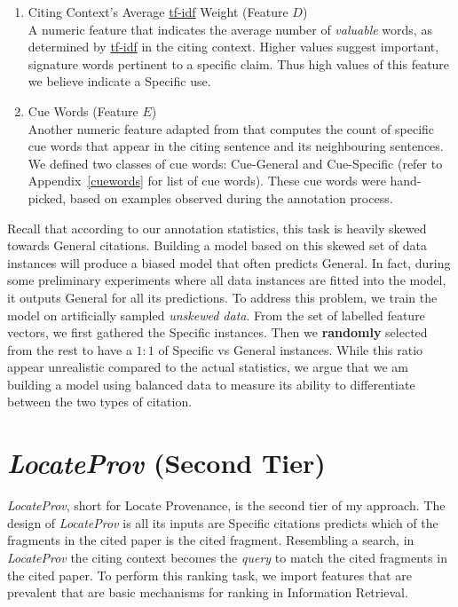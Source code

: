 \begin{enumerate}
\item Citing Context's Average \url{tf-idf} Weight (Feature $D$)\\
A numeric feature that indicates the average number of \textit{valuable} words, as determined by \url{tf-idf} \cite{irtextbook} in the citing context. Higher values suggest important, signature words pertinent to a specific claim.  Thus high values of this feature we believe indicate a Specific use.

\item Cue Words (Feature $E$)\\
Another numeric feature adapted from  that computes the count of specific cue words that appear in the citing sentence and its neighbouring sentences. We defined two classes of cue words: Cue-General and Cue-Specific (refer to Appendix~\ref{cuewords} for list of cue words). These cue words were hand-picked, based on examples observed during the annotation process.
\end{enumerate}

Recall that according to our annotation statistics, this task is heavily skewed towards General citations. Building a model based on this skewed set of data instances will produce a biased model that often predicts General. In fact, during some preliminary experiments where all data instances are fitted into the model, it outputs General for all its predictions. To address this problem, we train the model on artificially sampled {\it unskewed data}.  From the set of labelled feature vectors, we first gathered the Specific instances. Then we {\bf randomly} selected from the rest to have a $1:1$ of Specific vs General instances. While this ratio appear unrealistic compared to the actual statistics, we argue that we am building a model using balanced data to measure its ability to differentiate between the two types of citation.

\section{{\it LocateProv} (Second Tier)}
\label{secondtier}
{\it LocateProv}, short for Locate Provenance, is the second tier of my approach. The design of {\it LocateProv} is all its inputs are Specific citations predicts which of the fragments in the cited paper is the cited fragment. Resembling a search, in {\it LocateProv} the citing context becomes the {\it query} to match the cited fragments in the cited paper. To perform this ranking task, we import features that are prevalent that are basic mechanisms for ranking in Information Retrieval.

